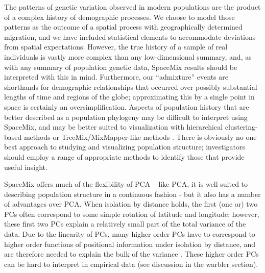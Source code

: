 \documentclass[12pt]{article}
\begin{document}
The patterns of genetic variation observed in modern populations are the product of a complex history of demographic processes.  We choose to model those patterns as the outcome of a spatial process with geographically determined migration,
and we have included statistical elements to accommodate deviations from spatial expectations.
However, the true history of a sample of real individuals is vastly more complex than any low-dimensional summary,
and, as with any summary of population genetic data, 
SpaceMix results should be interpreted with this in mind.
Furthermore, our ``admixture'' events are shorthands for demographic relationships
that occurred over possibly substantial lengths of time and regions of the globe;
approximating this by a single point in space is certainly an oversimplification.
Aspects of population history that are better described as a population phylogeny may be difficult to interpret using SpaceMix,
and may be better suited to visualization with hierarchical clustering-based methods \citep{STRUCTURE} or TreeMix/MixMapper-like methods \citep{Treemix,lipson_mixmapper_2013}.  
There is obviously no one best approach to studying and visualizing population structure;
investigators should employ a range of appropriate methods to identify those that provide useful insight. 

SpaceMix offers much of the flexibility of PCA -- like PCA, it is well suited to describing population structure in a continuous fashion - 
but it also has a number of advantages over PCA. 
When isolation by distance holds, the first (one or) two PCs often correspond to some simple rotation of latitude and longitude; 
however, these first two PCs explain a relatively small part of the total variance of the data. 
Due to the linearity of PCs, many higher order PCs 
have to correspond to higher order functions of positional information under isolation by distance, 
and are therefore needed to explain the bulk of the variance \citep{novembre_interpreting_2008}. 
These higher order PCs can be hard to interpret in empirical data (see discussion in the warbler section).
\end{document}
